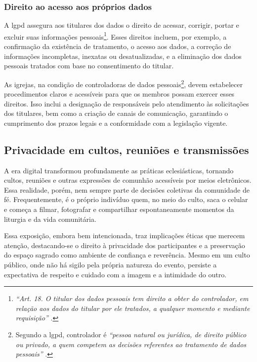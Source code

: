 \subsubsection{Direito ao acesso aos próprios dados}

A \gls{lgpd} assegura aos titulares dos dados o direito de acessar, corrigir, portar e excluir suas informações pessoais\footnote{\textit{``Art. 18. O titular dos dados pessoais tem direito a obter do controlador, em relação aos dados do titular por ele tratados, a qualquer momento e mediante requisição''} \cite[Cap.~III, art.~18]{lgpd2018}.}. Esses direitos incluem, por exemplo, a confirmação da existência de tratamento, o acesso aos dados, a correção de informações incompletas, inexatas ou desatualizadas, e a eliminação dos dados pessoais tratados com base no consentimento do titular.

As igrejas, na condição de controladoras de dados pessoais\footnote{Segundo a \gls{lgpd}, controlador é \textit{``pessoa natural ou jurídica, de direito público ou privado, a quem competem as decisões referentes ao tratamento de dados pessoais''} \cite[art.~5º, inciso~VI]{lgpd2018}.}, devem estabelecer procedimentos claros e acessíveis para que os membros possam exercer esses direitos. Isso inclui a designação de responsáveis pelo atendimento às solicitações dos titulares, bem como a criação de canais de comunicação, garantindo o cumprimento dos prazos legais e a conformidade com a legislação vigente.

\subsection{Privacidade em cultos, reuniões e transmissões}

A era digital transformou profundamente as práticas eclesiásticas, tornando cultos, reuniões e outras expressões de comunhão acessíveis por meios eletrônicos. Essa realidade, porém, nem sempre parte de decisões coletivas da comunidade de fé. Frequentemente, é o próprio indivíduo quem, no meio do culto, saca o celular e começa a filmar, fotografar e compartilhar espontaneamente momentos da liturgia e da vida comunitária.

Essa exposição, embora bem intencionada, traz implicações éticas que merecem atenção, destacando-se o direito à privacidade dos participantes e a preservação do espaço sagrado como ambiente de confiança e reverência. Mesmo em um culto público, onde não há sigilo pela própria natureza do evento, persiste a expectativa de respeito e cuidado com a imagem e a intimidade do outro.

